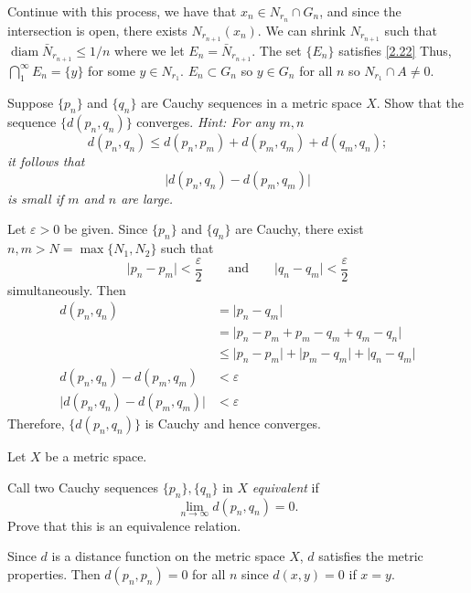 \begin{exercise}
  Continue with this process, we have that \(x_n\in N_{r_n}\cap G_n\), and
  since the intersection is open, there exists \(N_{r_{n + 1}}(x_n)\).
  We can shrink \(N_{r_{n + 1}}\) such that
  \(\operatorname{diam}\bar{N}_{r_{n + 1}}\leq 1/n\) where we let
  \(E_n = \bar{N}_{r_{n + 1}}\).
  The set \(\{E_n\}\) satisfies \cref{2.22}
  Thus, \(\bigcap_1^{\infty}E_n = \{y\}\) for some \(y\in N_{r_1}\).
  \(E_n\subset G_n\) so \(y\in G_n\) for all \(n\) so \(N_{r_1}\cap A\neq 0\).
\item
  \label{3.23}
  Suppose \(\{p_n\}\) and \(\{q_n\}\) are Cauchy sequences in a metric space
  \(X\).
  Show that the sequence \(\{d(p_n,q_n)\}\) converges.
  \textit{Hint: For any \(m,n\)
    \[
    d(p_n, q_n)\leq d(p_n, p_m) + d(p_m, q_m) + d(q_m, q_n);
    \]
    it follows that
    \[
    \lvert d(p_n, q_n) - d(p_m, q_m)\rvert
    \]
    is small if \(m\) and \(n\) are large.}
  \par\smallskip
  Let \(\varepsilon > 0\) be given.
  Since \(\{p_n\}\) and \(\{q_n\}\) are Cauchy, there exist
  \(n,m > N = \max\{N_1,N_2\}\) such that
  \[
  \lvert p_n - p_m\rvert < \frac{\varepsilon}{2}\qquad\text{and}\qquad
  \lvert q_n - q_m\rvert < \frac{\varepsilon}{2}
  \]
  simultaneously.
  Then
  \begin{align*}
    d(p_n, q_n) & = \lvert p_n - q_m\rvert\\
                & = \lvert p_n - p_m + p_m - q_m + q_m - q_n\rvert\\
                & \leq \lvert p_n - p_m\rvert + \lvert p_m - q_m\rvert +
                  \lvert q_n - q_m\rvert\\
    d(p_n, q_n) - d(p_m, q_m) & < \varepsilon\\
    \lvert d(p_n, q_n) - d(p_m, q_m)\rvert & < \varepsilon
  \end{align*}
  Therefore, \(\{d(p_n,q_n)\}\) is Cauchy and hence converges.
\item
  Let \(X\) be a metric space.
  \begin{exercise}[label = (\alph*), ref = \arabic{exercisei} (\alph*)]
  \item
    Call two Cauchy sequences \(\{p_n\},\{q_n\}\) in \(X\) \textit{equivalent}
    if
    \[
    \lim_{n\to\infty} d(p_n,q_n) = 0.
    \]
    Prove that this is an equivalence relation.
    \par\smallskip
    Since \(d\) is a distance function on the metric space \(X\), \(d\)
    satisfies the metric properties.
    Then \(d(p_n,p_n) = 0\) for all \(n\) since \(d(x,y) = 0\) if \(x = y\).

\end{exercise}
\end{exercise}

